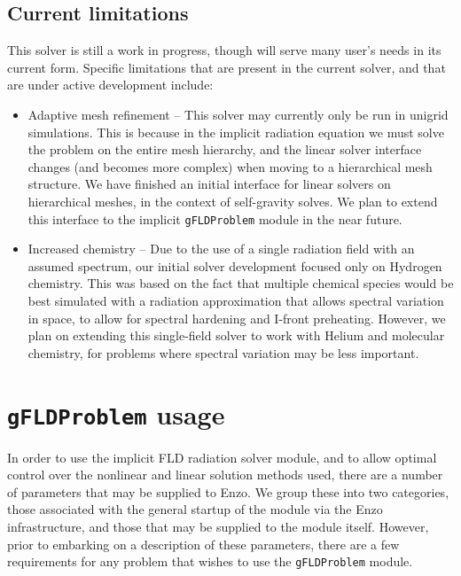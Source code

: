 \documentclass[letterpaper,10pt]{article}
\renewcommand{\(}{\left(}
\renewcommand{\)}{\right)}
\begin{document}
\subsection{Current limitations}
\label{sec:limitations}

This solver is still a work in progress, though will serve many user's
needs in its current form.  Specific limitations that are present in
the current solver, and that are under active development include:
\begin{itemize}
\item Adaptive mesh refinement -- This solver may currently only be
  run in unigrid simulations.  This is because in the implicit
  radiation equation we must solve the problem on the entire mesh
  hierarchy, and the linear solver interface changes (and becomes more
  complex) when moving to a hierarchical mesh structure.  We have
  finished an initial interface for linear solvers on hierarchical
  meshes, in the context of self-gravity solves.  We plan to extend
  this interface to the implicit {\tt gFLDProblem} module in the near
  future.
\item Increased chemistry -- Due to the use of a single radiation
  field with an assumed spectrum, our initial solver development
  focused only on Hydrogen chemistry.  This was based on the fact that
  multiple chemical species would be best simulated with a radiation
  approximation that allows spectral variation in space, to allow for
  spectral hardening and I-front preheating.  However, we plan on
  extending this single-field solver to work with Helium and molecular
  chemistry, for problems where spectral variation may be less
  important.
\end{itemize}




\section{{\tt gFLDProblem} usage}
\label{sec:module_usage}

In order to use the implicit FLD radiation solver module, and to
allow optimal control over the nonlinear and linear solution methods
used, there are a number of parameters that may be supplied to Enzo.
We group these into two categories, those associated with the general
startup of the module via the Enzo infrastructure, and those that may
be supplied to the module itself.  However, prior to embarking on a
description of these parameters, there are a few requirements for any
problem that wishes to use the {\tt gFLDProblem} module.
\end{document}
